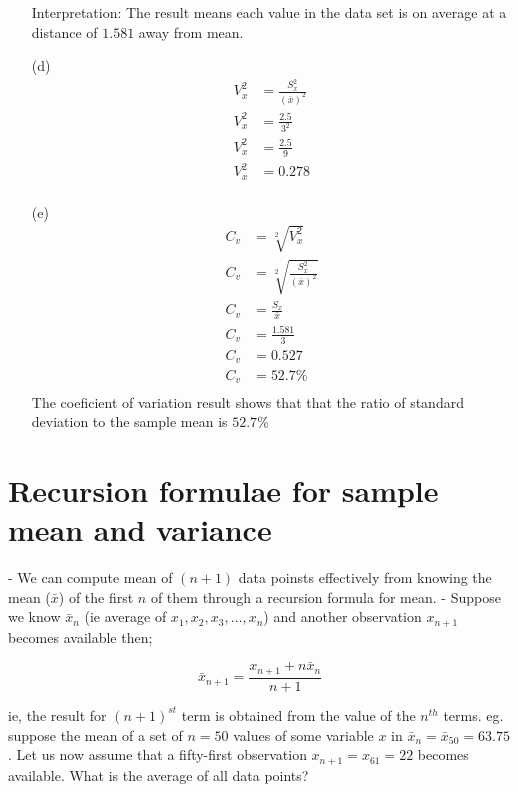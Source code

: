 \begin{enumerate}
        Interpretation: The result means each value in the data set is on average at a distance of $1.581$ away from mean.
    \item[(d)]
        \begin{align*}
            V_x^2 & = \frac{S_x^2}{(\bar{x})^2} \\
            V_x^2 & = \frac{2.5}{3^2}           \\
            V_x^2 & = \frac{2.5}{9}             \\
            V_x^2 & = 0.278                     \\
        \end{align*}
    \item[(e)]
        \begin{align*}
            C_v & = \sqrt[2]{V_x^2}                     \\
            C_v & = \sqrt[2]{\frac{S_x^2}{(\bar{x})^2}} \\
            C_v & = \frac{S_x}{\bar{x}}                 \\
            C_v & = \frac{1.581}{3}                     \\
            C_v & = 0.527                               \\
            C_v & = 52.7\%                              \\
        \end{align*}
        The coeficient of variation result shows that that the ratio of standard deviation to the sample mean is $52.7\%$
\end{enumerate}
\section{Recursion formulae for sample mean and variance}
- We can compute mean of $(n + 1)$ data poinsts effectively from knowing the mean ($\bar{x}$) of the first $n$ of them through a recursion formula for mean.
- Suppose we know $\bar{x}_{n}$ (ie average of $x_1, x_2, x_3, \dots, x_n$) and another observation $x_{n+1}$ becomes available then;

\begin{equation}
    \bar{x}_{n + 1} = \frac{x_{n+1} + n\bar{x}_n}{n + 1}
\end{equation}

ie, the result for $(n + 1)^{st}$ term is obtained from the value of the $n^{th}$ terms.
eg. suppose the mean of a set of $n = 50$ values of some variable $x$ in $\bar{x}_n = \bar{x}_{50} = 63.75$. Let us now assume that a fifty-first observation $x_{n + 1} = x_{61} = 22$ becomes available. What is the average of all data points?

